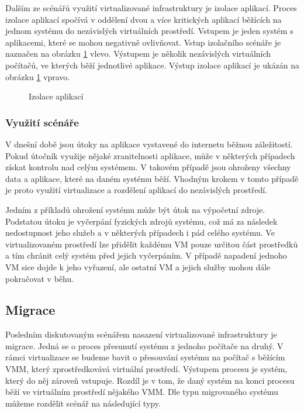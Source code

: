 Dalším ze scénářů využití virtualizované infrastruktury je izolace aplikací. Proces izolace aplikací spočívá v oddělení dvou a více kritických aplikací běžících na jednom systému do nezávislých virtuálních prostředí.
Vstupem je jeden systém s aplikacemi, které se mohou negativně ovlivňovat. Vstup izolačního scénáře je naznačen na obrázku \ref{izolation} vlevo. Výstupem je několik nezávislých virtuálních počítačů, ve kterých běží
jednotlivé aplikace. Výstup izolace aplikací je ukázán na obrázku \ref{izolation} vpravo.

\begin{figure}
    \centering    
    \caption{Izolace aplikací}
    \label{izolation}
\end{figure}

\subsubsection*{Využití scénáře}

V dnešní době jsou útoky na aplikace vystavené do internetu běžnou záležitostí. Pokud útočník využije nějaké zranitelnosti aplikace, může v některých případech získat kontrolu nad celým systémem. V takovém případě jsou
ohroženy všechny data a aplikace, které na daném systému běží. Vhodným krokem v tomto případě je proto využití virtualizace a rozdělení aplikací do nezávislých prostředí.

Jedním z příkladů ohrožení systému může být útok na výpočetní zdroje. Podstatou útoku je vyčerpání fyzických zdrojů systému, což má za následek nedostupnost jeho služeb a v některých případech i pád celého systému.
Ve virtualizovaném prostředí lze přidělit každému VM pouze určitou část prostředků a tím chránit celý systém před jejich vyčerpáním. V případě napadení jednoho VM sice dojde k jeho vyřazení, ale ostatní VM a jejich služby
mohou dále pokračovat v běhu.

\subsection{Migrace}

Posledním diskutovaným scénářem nasazení virtualizované infrastruktury je migrace. Jedná se o proces přesunutí systému z jednoho počítače na druhý. V rámci virtualizace se budeme bavit o přesouvání systému na počítač s běžícím VMM,
který zprostředkovává virtuální prostředí. Výstupem procesu je systém, který do něj zároveň vstupuje. Rozdíl je v tom, že daný systém na konci procesu běží ve virtuálním prostředí nějakého VMM. Dle typu migrovaného systému můžeme
rozdělit scénář na následující typy.

